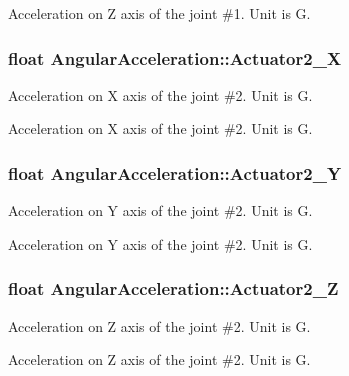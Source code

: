 Acceleration on Z axis of the joint \#1. Unit is G. 
\subsubsection[{\texorpdfstring{Actuator2\+\_\+X}{Actuator2_X}}]{\setlength{\rightskip}{0pt plus 5cm}float Angular\+Acceleration\+::\+Actuator2\+\_\+X}\hypertarget{structAngularAcceleration_a203e9902f7e841db9df92d96082dbde7}{}\label{structAngularAcceleration_a203e9902f7e841db9df92d96082dbde7}


Acceleration on X axis of the joint \#2. Unit is G. 

Acceleration on X axis of the joint \#2. Unit is G. 
\subsubsection[{\texorpdfstring{Actuator2\+\_\+Y}{Actuator2_Y}}]{\setlength{\rightskip}{0pt plus 5cm}float Angular\+Acceleration\+::\+Actuator2\+\_\+Y}\hypertarget{structAngularAcceleration_a64c0708882b11a7e05d8c893bea8f8e1}{}\label{structAngularAcceleration_a64c0708882b11a7e05d8c893bea8f8e1}


Acceleration on Y axis of the joint \#2. Unit is G. 

Acceleration on Y axis of the joint \#2. Unit is G. 
\subsubsection[{\texorpdfstring{Actuator2\+\_\+Z}{Actuator2_Z}}]{\setlength{\rightskip}{0pt plus 5cm}float Angular\+Acceleration\+::\+Actuator2\+\_\+Z}\hypertarget{structAngularAcceleration_a617d68c9abfc43629b2293e27370b539}{}\label{structAngularAcceleration_a617d68c9abfc43629b2293e27370b539}


Acceleration on Z axis of the joint \#2. Unit is G. 

Acceleration on Z axis of the joint \#2. Unit is G. 

